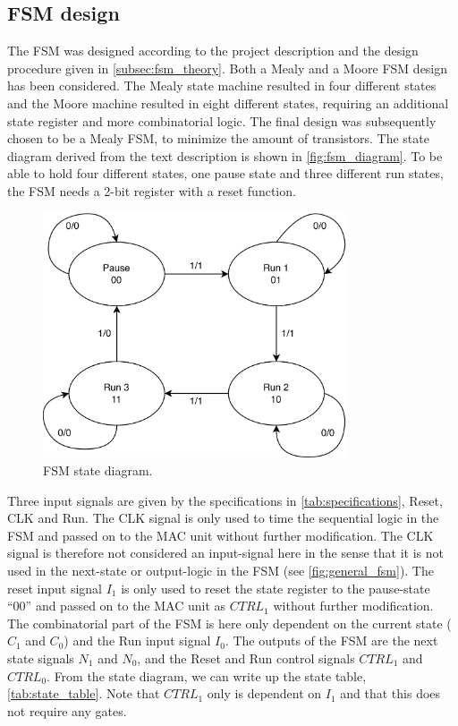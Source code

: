 \subsection{FSM design}

The FSM was designed according to the project description and the design procedure given in \autoref{subsec:fsm_theory}. Both a Mealy and a Moore FSM design has been considered. The Mealy state machine resulted in four different states and the Moore machine resulted in eight different states, requiring an additional state register and more combinatorial logic. The final design was subsequently chosen to be a Mealy FSM, to minimize the amount of transistors. The state diagram derived from the text description is shown in \autoref{fig:fsm_diagram}. To be able to hold four different states, one pause state and three different run states, the FSM needs a 2-bit register with a reset function. 

\begin{figure}[H]
    \centering
    \includegraphics[width=0.8\textwidth]{Figures/FSM-diagram.png}
    \caption{FSM state diagram.}
    \label{fig:fsm_diagram}
\end{figure}

Three input signals are given by the specifications in \autoref{tab:specifications}, Reset, CLK and Run. The CLK signal
is only used to time the sequential logic in the FSM and passed on to the MAC unit without
further modification. The CLK signal is therefore not considered an input-signal here in the sense that it is not used in the next-state or output-logic in the FSM (see \autoref{fig:general_fsm}). The reset input signal $I_1$ is only used to reset the state register to the pause-state ``00'' and passed on to the MAC unit as $CTRL_1$ without further modification. The combinatorial part of the FSM is here only dependent on the current state ($C_1$ and $C_0$) and the Run input signal $I_0$. The outputs of the FSM are the next state signals $N_1$ and $N_0$, and the Reset and Run control signals $CTRL_1$ and $CTRL_0$. From the state diagram, we can write up the state table, \autoref{tab:state_table}. Note that $CTRL_1$ only is dependent on $I_1$ and that this does not require any gates.

